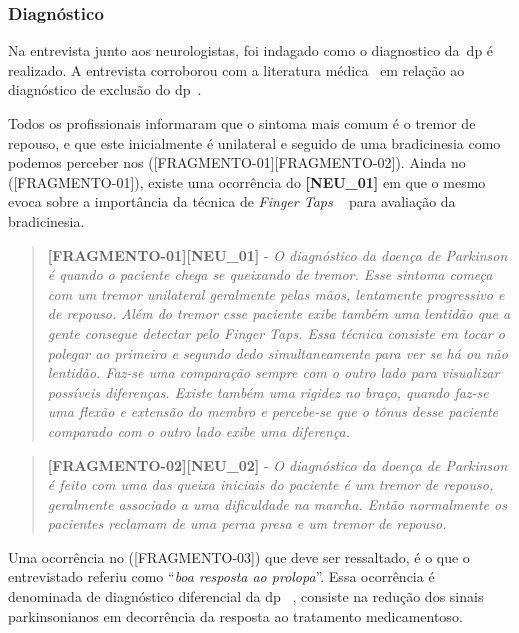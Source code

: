 \subsubsection{Diagnóstico}\label{section:analise_diagnostico}

Na entrevista junto aos neurologistas, foi indagado como o diagnostico da~\ac{dp} é realizado.  A entrevista corroborou com a literatura médica~\cite{tolosa06,vedolin2003} em relação ao diagnóstico de exclusão do \ac{dp}~\cite{protpar010,national2006parkinson}.  

Todos os profissionais informaram que o sintoma mais comum é o tremor de repouso, e que este inicialmente é unilateral e seguido de uma bradicinesia como podemos perceber nos ([FRAGMENTO-01][FRAGMENTO-02]). Ainda no ([FRAGMENTO-01]), existe uma ocorrência do \textbf{[NEU\_01]} em que o mesmo evoca sobre a importância da técnica de \textit{Finger Taps} ~\cite{updrs87} para avaliação da bradicinesia.


\begin{quote}
\textbf{[FRAGMENTO-01][NEU\_01]} - 
\emph{
O diagnóstico da doença de Parkinson é quando o paciente chega se queixando de tremor. Esse sintoma começa com um tremor unilateral geralmente pelas mãos, lentamente progressivo e de repouso. Além do tremor esse paciente exibe também uma lentidão que a gente consegue detectar pelo \textit{Finger Taps}. Essa técnica consiste em tocar o polegar ao primeiro e segundo dedo simultaneamente para ver se há ou não lentidão. Faz-se uma comparação sempre com o outro lado para visualizar possíveis diferenças. 
Existe também uma rigidez no braço, quando faz-se uma flexão e extensão do membro e percebe-se que o tônus desse paciente comparado com o outro lado exibe uma diferença.
}
\end{quote}

\begin{quote}
\textbf{[FRAGMENTO-02][NEU\_02]} -
\emph{
O diagnóstico da doença de Parkinson é feito com uma das queixa iniciais do paciente é um tremor de repouso, geralmente associado a uma dificuldade na marcha. Então normalmente os pacientes reclamam de uma perna presa e um tremor de repouso. 
}
\end{quote}

Uma ocorrência no ([FRAGMENTO-03]) que deve ser ressaltado, é o que o entrevistado referiu como ``\textit{boa resposta ao prolopa}''. Essa ocorrência é denominada de diagnóstico diferencial da \ac{dp} ~\cite{protpar010}, consiste na redução dos sinais parkinsonianos em decorrência da resposta ao tratamento medicamentoso. 

